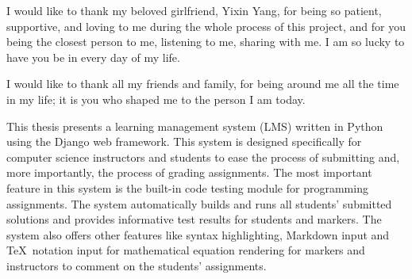 \medskip

I would like to thank my beloved girlfriend, Yixin Yang,
for being so patient, supportive, and loving to me during the whole process
of this project, 
and for you being the closest person to me, listening to me, sharing with me.
I am so lucky to have you be in every day of my life.

\medskip

I would like to thank all my friends and family, for being around me all
the time in my life; it is you who shaped me to the person
I am today.



\tocAndSuch



This thesis presents a learning management system (LMS) written in Python using
the Django web framework. This system is designed specifically for computer
science instructors and students to ease the process of submitting and,
more importantly, the process of grading assignments. 
The most important feature in this system is the built-in code
testing module for programming assignments. The system
automatically builds and runs all students'
submitted solutions and provides informative test results for students and
markers.
The system also offers other features like syntax highlighting, Markdown input
and \TeX\ notation input for mathematical equation rendering for
markers and instructors to comment on the students' assignments.



\afterpreface
